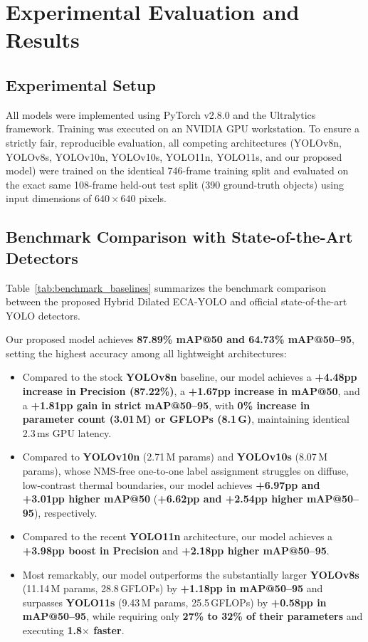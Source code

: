 \documentclass[journal,twoside,web]{ieeecolor}
\begin{document}
\section{Experimental Evaluation and Results}
\label{sec:experiments}

\subsection{Experimental Setup}
All models were implemented using PyTorch v2.8.0 and the Ultralytics framework. Training was executed on an NVIDIA GPU workstation. To ensure a strictly fair, reproducible evaluation, all competing architectures (YOLOv8n, YOLOv8s, YOLOv10n, YOLOv10s, YOLO11n, YOLO11s, and our proposed model) were trained on the identical 746-frame training split and evaluated on the exact same 108-frame held-out test split (390 ground-truth objects) using input dimensions of $640\times640$ pixels.

\subsection{Benchmark Comparison with State-of-the-Art Detectors}
Table~\ref{tab:benchmark_baselines} summarizes the benchmark comparison between the proposed Hybrid Dilated ECA-YOLO and official state-of-the-art YOLO detectors. 

Our proposed model achieves \textbf{87.89\% mAP@50 and 64.73\% mAP@50--95}, setting the highest accuracy among all lightweight architectures:
\begin{itemize}
    \item Compared to the stock \textbf{YOLOv8n} baseline, our model achieves a \textbf{+4.48pp increase in Precision (87.22\%)}, a \textbf{+1.67pp increase in mAP@50}, and a \textbf{+1.81pp gain in strict mAP@50--95}, with \textbf{0\% increase in parameter count (3.01\,M) or GFLOPs (8.1\,G)}, maintaining identical 2.3\,ms GPU latency.
    \item Compared to \textbf{YOLOv10n} (2.71\,M params) and \textbf{YOLOv10s} (8.07\,M params), whose NMS-free one-to-one label assignment struggles on diffuse, low-contrast thermal boundaries, our model achieves \textbf{+6.97pp and +3.01pp higher mAP@50} (\textbf{+6.62pp and +2.54pp higher mAP@50--95}), respectively.
    \item Compared to the recent \textbf{YOLO11n} architecture, our model achieves a \textbf{+3.98pp boost in Precision} and \textbf{+2.18pp higher mAP@50--95}.
    \item Most remarkably, our model outperforms the substantially larger \textbf{YOLOv8s} (11.14\,M params, 28.8\,GFLOPs) by \textbf{+1.18pp in mAP@50--95} and surpasses \textbf{YOLO11s} (9.43\,M params, 25.5\,GFLOPs) by \textbf{+0.58pp in mAP@50--95}, while requiring only \textbf{27\% to 32\% of their parameters} and executing \textbf{1.8$\times$ faster}.
\end{itemize}
\end{document}
